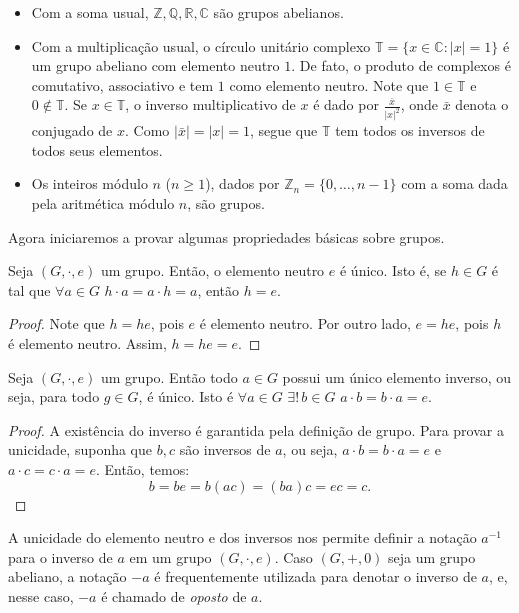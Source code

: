 \begin{itemize}
    \item Com a soma usual, $\mathbb{Z, Q, R, C}$ são grupos abelianos.
    \item Com a multiplicação usual, o círculo unitário complexo $\mathbb T=\{x \in \mathbb C: |x|=1\}$ é um grupo abeliano com elemento neutro $1$. De fato, o produto de complexos é comutativo, associativo e tem $1$ como elemento neutro. Note que $1\in \mathbb T$ e $0\notin \mathbb T$. Se $x \in \mathbb T$, o inverso multiplicativo de $x$ é dado por $\frac{\bar x}{|x|^2}$, onde $\bar x$ denota o conjugado de $x$. Como $|\bar x|=|x|=1$, segue que $\mathbb T$ tem todos os inversos de todos seus elementos.
    \item Os inteiros módulo $n$ ($n\geq 1$), dados por $\mathbb Z_n=\{0, \dots, n-1\}$ com a soma dada pela aritmética módulo $n$, são grupos.
\end{itemize}

Agora iniciaremos a provar algumas propriedades básicas sobre grupos.
\begin{prop}
    Seja $(G,\cdot,e)$ um grupo. Então, o elemento neutro $e$ é único. Isto é, se $h \in G$ é tal que $\forall a \in G$ $h \cdot a = a \cdot h = a$, então $h = e$.
\end{prop}
\begin{proof}
    Note que $h=he$, pois $e$ é elemento neutro. Por outro lado, $e=he$, pois $h$ é elemento neutro. Assim, $h=he=e$.
\end{proof}

\begin{prop}\label{prop:inverso_unico_grupo}
    Seja $(G,\cdot,e)$ um grupo. Então todo $a \in G$ possui um único elemento inverso, ou seja, para todo $g \in G$,  é único. Isto é $\forall a \in G$ $\exists!\, b \in G$ $a \cdot b = b \cdot a = e$.
\end{prop}
\begin{proof}
    A existência do inverso é garantida pela definição de grupo. Para provar a unicidade, suponha que $b, c$ são inversos de $a$, ou seja, $a \cdot b = b \cdot a = e$ e $a \cdot c = c \cdot a = e$.
    Então, temos:
    $$b=be=b(ac)=(ba)c=ec=c.$$
\end{proof}

A unicidade do elemento neutro e dos inversos nos permite definir a notação $a^{-1}$ para o inverso de $a$ em um grupo $(G,\cdot,e)$. Caso $(G, +, 0)$ seja um grupo abeliano, a notação $-a$ é frequentemente utilizada para denotar o inverso de $a$, e, nesse caso, $-a$ é chamado de \emph{oposto} de $a$.

